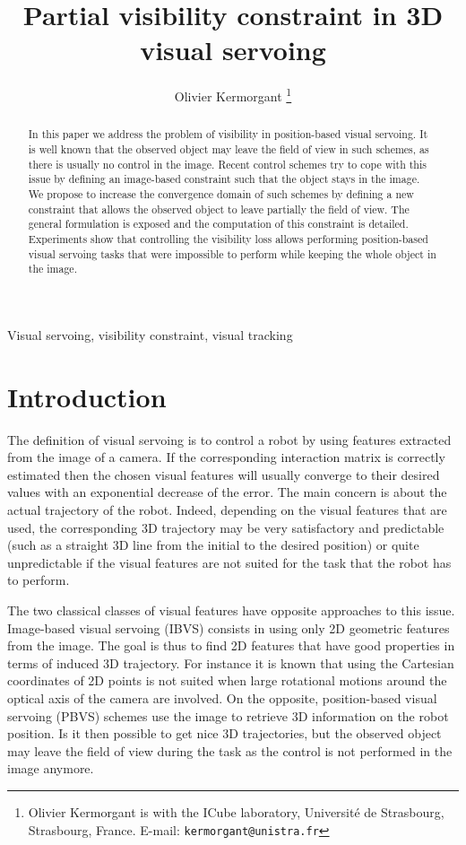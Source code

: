 \documentclass[letterpaper, 10 pt, conference]{IEEEtran}  %
\title{\LARGE \bf Partial visibility constraint in 3D visual servoing}
\author{Olivier Kermorgant
  \thanks{Olivier Kermorgant is with the ICube laboratory, Université de Strasbourg, Strasbourg, France.\newline
	E-mail: {\tt\small kermorgant@unistra.fr}}
}
\begin{document}
\maketitle

\thispagestyle{empty}
\pagestyle{empty}


\begin{abstract}
In this paper we address the problem of visibility in position-based visual servoing.
It is well known that the observed object may leave the field of view in such schemes, as there is usually no control in the image.
Recent control schemes try to cope with this issue by defining an image-based constraint such that the object stays in the image.
We propose to increase the convergence domain of such schemes by defining a new constraint that allows the observed object to leave partially the field of view. 
The general formulation is exposed and the computation of this constraint is detailed.
Experiments show that controlling the visibility loss allows performing position-based visual servoing tasks that were impossible to perform while keeping the whole object in the image. 
\end{abstract}
\begin{keywords}
  Visual servoing, visibility constraint, visual tracking
\end{keywords}



\section{Introduction}

The definition of visual servoing is to control a robot by using features extracted from the image of a camera.
If the corresponding interaction matrix is correctly estimated \cite{2006_mra_chaumette} then the chosen visual features will usually converge to their desired values with an exponential decrease of the error.
The main concern is about the actual trajectory of the robot. Indeed, depending on the visual features that are used, the corresponding 3D trajectory may be very satisfactory and predictable (such as a straight 3D line from the initial to the desired position) or quite unpredictable if the visual features are not suited for the task that the robot has to perform. 

The two classical classes of visual features have opposite approaches to this issue.
Image-based visual servoing (IBVS) consists in using only 2D geometric features from the image. The goal is thus to find 2D features that have good properties in terms of induced 3D trajectory. For instance it is known that using the Cartesian coordinates of 2D points is not suited when large rotational motions around the optical axis of the camera are involved.
On the opposite, position-based visual servoing  (PBVS) schemes use the image to retrieve 3D information on the robot position. Is it then possible to get nice 3D trajectories, but the observed object may leave the field of view during the task as the control is not performed in the image anymore.
\end{document}
